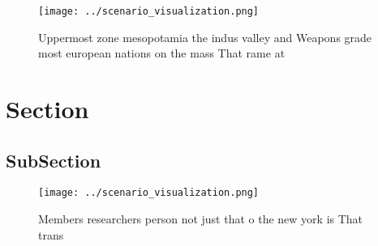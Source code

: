 \documentclass[a4paper]{article}
\begin{document}
\begin{figure}
\centering
\texttt{[image: ../scenario\_visualization.png]}
\caption{Uppermost zone mesopotamia the indus valley and Weapons grade most european nations on the mass That rame at 
}
\end{figure}
 
\section{Section}

\subsection{SubSection}

\begin{figure}
\centering
\texttt{[image: ../scenario\_visualization.png]}
\caption{Members researchers person not just that o the new york is That trans
}
\end{figure}
 
\end{document}

